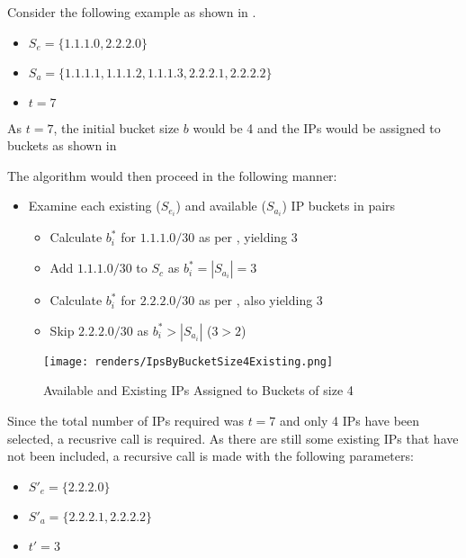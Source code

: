 Consider the following example as shown in .
\begin{itemize}
\item{$S_e = \{1.1.1.0, 2.2.2.0\}$}
\item{$S_a = \{1.1.1.1, 1.1.1.2, 1.1.1.3, 2.2.2.1, 2.2.2.2\}$}
\item{$t = 7$}
\end{itemize}

As $t = 7$, the initial bucket size $b$ would be 4 and the IPs would be assigned to buckets as shown in 

The algorithm would then proceed in the following manner:
\begin{itemize}
\item{Examine each existing ($S_{e_i}$) and available ($S_{a_i}$) IP buckets in pairs}
\begin{itemize}
\item{Calculate $b_i^*$ for $1.1.1.0/30$ as per , yielding 3}
\item{Add $1.1.1.0/30$ to $S_c$ as $b^*_i = |S_{a_i}| = 3$}
\end{itemize}
\begin{itemize}
\item{Calculate $b_i^*$ for $2.2.2.0/30$ as per , also yielding 3}
\item{Skip $2.2.2.0/30$ as $b^*_i > |S_{a_i}|$ ($3 > 2$)}    
\end{itemize}
\end{itemize}

\begin{figure}[H]
      \centering
      \texttt{[image: renders/IpsByBucketSize4Existing.png]}
      \caption{Available and Existing IPs Assigned to Buckets of size 4}
      \label{fig:ipsByBucketExisting4}
\end{figure}

Since the total number of IPs required was $t = 7$ and only 4 IPs have been selected, a recusrive call is required. As there are still some existing IPs that have not been included, a recursive call is made with the following parameters:
\begin{itemize}
\item{$S'_e = \{2.2.2.0\}$}
\item{$S'_a = \{2.2.2.1, 2.2.2.2\}$}
\item{$t' = 3$}
\end{itemize}

